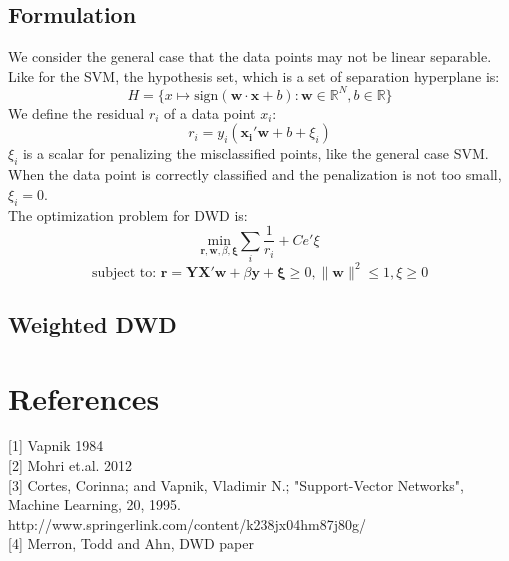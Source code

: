 \documentclass[12pt]{article}
\theoremstyle{definition}
\theoremstyle{remark}
\numberwithin{equation}{section}
\begin{document}
\subsection{Formulation}
We consider the general case that the data points may not be linear separable. Like for the SVM, the hypothesis set, which is a set of separation hyperplane is:
\[H = \{x\mapsto \mathrm{sign}(\mathbf{w\cdot x}+b): \mathbf{w} \in \mathbb{R}^N, b \in \mathbb{R} \}\]
We define the residual $r_i$ of a data point $x_i$:
\[r_i = y_i(\mathbf{x_i'w}+b+\xi_i)\]
$\xi_i$ is a scalar for penalizing the misclassified points, like the general case SVM. When the data point is correctly classified and the penalization is not too small, $\xi_i = 0$. \\[0.2cm]
The optimization problem for DWD is: 
\[\underset{\mathbf{r,w,}\beta,\mathbf{\xi}}{\mathrm{min}}\sum_i \frac{1}{r_i} + Ce'\xi\]
\[\text{subject to: }\mathbf{r} = \mathbf{YX'w} + \beta\mathbf{y} + \mathbf{\xi} \geq 0, \|\mathbf{w}\|^2 \leq 1, \xi \geq 0\]
\subsection{Weighted DWD}

\section{References}
[1] Vapnik 1984 \\[0.2cm]
[2] Mohri et.al. 2012 \\ [0.2cm]
[3] Cortes, Corinna; and Vapnik, Vladimir N.; "Support-Vector Networks", Machine Learning, 20, 1995.\\ http://www.springerlink.com/content/k238jx04hm87j80g/ \\[0.2cm]
[4] Merron, Todd and Ahn, DWD paper
\end{document}
